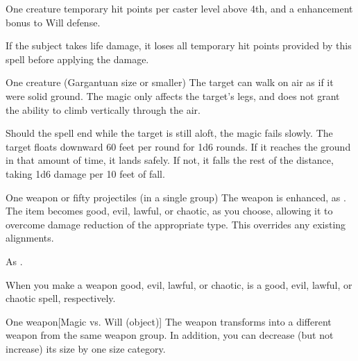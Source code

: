 \spellrng{\rngclose}
\spelldur{\durshort}
\begin{spelltarget}{One creature}
     temporary hit points  per caster level above 4th, and a  enhancement bonus to Will defense. \spellbonusscalingdescription
\end{spelltarget}
\spellnotes If the subject takes life damage, it loses all temporary hit points provided by this spell before applying the damage.

\spellrng{\rngtouch}
\spelldur{\durshort}
\begin{spelltarget}{One creature (Gargantuan size or smaller)}
    \spelleffect The target can walk on air as if it were solid ground. The magic only affects the target's legs, and does not grant the ability to climb vertically through the air.
    \par Should the spell end while the target is still aloft, the magic fails slowly. The target floats downward 60 feet per round for 1d6 rounds. If it reaches the ground in that amount of time, it lands safely. If not, it falls the rest of the distance, taking 1d6 damage per 10 feet of fall.
\end{spelltarget}

\spellrng{\rngclose}
\begin{spelltarget}{One weapon or fifty projectiles (in a single group)}
    \spelleffect The weapon is enhanced, as .
    \spellsuccess The item becomes good, evil, lawful, or chaotic, as you choose, allowing it to overcome damage reduction of the appropriate type. This overrides any existing alignments.
\end{spelltarget}
\spellnotes As .

When you make a weapon good, evil, lawful, or chaotic,  is a good, evil, lawful, or chaotic spell, respectively.

\spelldur{\durmed}
\begin{spelltarget}{One weapon}[Magic vs. Will (object)]
    \spellsuccess The weapon transforms into a different weapon from the same weapon group. In addition, you can decrease (but not increase) its size by one size category.
\end{spelltarget}

